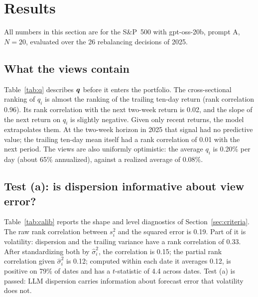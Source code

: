 \section{Results}\label{sec:results}

All numbers in this section are for the S\&P~500 with gpt-oss-20b, prompt A, $N=20$, evaluated over the 26 rebalancing decisions of 2025. 

\subsection{What the views contain}\label{sec:res_q}
Table~\ref{tab:q} describes $\bm{q}$ before it enters the portfolio. The cross-sectional ranking of $q_i$ is almost the ranking of the trailing ten-day return (rank correlation 0.96). Its rank correlation with the next two-week return is 0.02, and the slope of the next return on $q_i$ is slightly negative. Given only recent returns, the model extrapolates them. At the two-week horizon in 2025 that signal had no predictive value; the trailing ten-day mean itself had a rank correlation of 0.01 with the next period. The views are also uniformly optimistic: the average $q_i$ is 0.20\% per day (about 65\% annualized), against a realized average of 0.08\%.

\begin{table}[t]
\centering
\caption{What the LLM views contain. Rank correlations are cross-sectional Spearman correlations computed at each rebalancing date and averaged over the 34 dates. US, gpt-oss-20b, prompt A, $N=20$.}
\label{tab:q}
\small

\end{table}

\subsection{Test (a): is dispersion informative about view error?}\label{sec:res_a}
Table~\ref{tab:calib} reports the shape and level diagnostics of Section~\ref{sec:criteria}. The raw rank correlation between $s_i^2$ and the squared error is 0.19. Part of it is volatility: dispersion and the trailing variance have a rank correlation of 0.33. After standardizing both by $\hat\sigma_i^2$, the correlation is 0.15; the partial rank correlation given $\hat\sigma_i^2$ is 0.12; computed within each date it averages 0.12, is positive on 79\% of dates and has a $t$-statistic of 4.4 across dates. Test (a) is passed: LLM dispersion carries information about forecast error that volatility does not.

